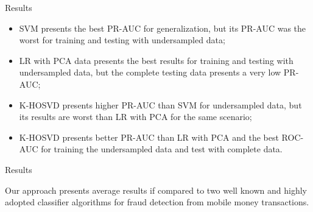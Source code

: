 \documentclass[newPxFont, numfooter, sectionpages]{beamer}
\begin{document}
\begin{frame}[c]{Results}

	\begin{itemize}
		\item SVM presents the best PR-AUC for generalization, but its PR-AUC was the worst for training and testing with undersampled data;
		\item LR with PCA data presents the best results for training and testing with undersampled data, but the complete testing data presents a very low PR-AUC;
		\item K-HOSVD presents higher PR-AUC than SVM for undersampled data, but its results are worst than LR with PCA for the same scenario;
		\item K-HOSVD presents better PR-AUC than LR with PCA and the best ROC-AUC for training the undersampled data and test with complete data.
	\end{itemize}

\end{frame}
\begin{frame}[c]{Results}

	Our approach presents average results if compared to two well known and highly adopted classifier algorithms for fraud detection from mobile money transactions.

\end{frame}


%
%
\end{document}
